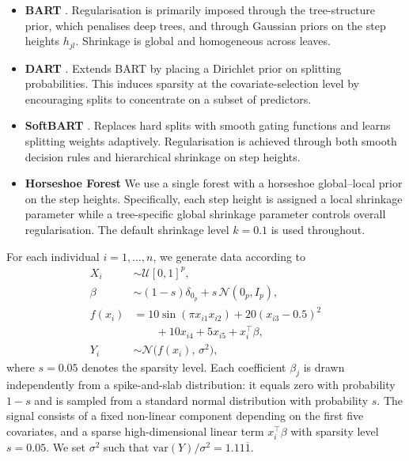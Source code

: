 \begin{itemize}

\item \textbf{BART} \citep{BARToriginal}.  
Regularisation is primarily imposed through the tree-structure prior, which penalises deep trees, and through Gaussian priors on the step heights $h_{jl}$. 
Shrinkage is global and homogeneous across leaves.

\item \textbf{DART} \citep{linero2018dirichlet}.  
Extends BART by placing a Dirichlet prior on splitting probabilities. 
This induces sparsity at the covariate-selection level by encouraging splits to concentrate on a subset of predictors.

\item \textbf{SoftBART} \citep{LineroYang2018}.  
Replaces hard splits with smooth gating functions and learns splitting weights adaptively. 
Regularisation is achieved through both smooth decision rules and hierarchical shrinkage on step heights.

\item \textbf{Horseshoe Forest} \citep{main_article}  
We use a single forest with a horseshoe global--local prior on the step heights.
Specifically, each step height is assigned a local shrinkage parameter while a tree-specific global shrinkage parameter controls overall regularisation. 
The default shrinkage level $k=0.1$ is used throughout. 


\end{itemize}


For each individual $i = 1,\ldots,n$, we generate data according to
\begin{equation}
\begin{split}
    X_i &\sim \mathcal{U}[0,1]^p, \\
    \beta &\sim (1-s)\delta_{0_p} + s\,\mathcal{N}(0_p, I_p), \\
    f(x_i) &= 10 \sin(\pi x_{i1} x_{i2})
             + 20 (x_{i3} - 0.5)^2\\
             &\quad\quad + 10 x_{i4}
             + 5 x_{i5}
             + x_i^\top \beta, \\
    Y_i &\sim \mathcal{N}\big(f(x_i),\, \sigma^2\big),
\end{split}
\end{equation}
where $s = 0.05$ denotes the sparsity level. 
Each coefficient $\beta_j$ is drawn independently from a spike-and-slab distribution: it equals zero with probability $1-s$ and is sampled from a standard normal distribution with probability $s$.
The signal consists of a fixed non-linear component \citep{Friedman} depending on the first five covariates, and a sparse high-dimensional linear term $x_i^\top \beta$ with  sparsity level $s=0.05$. 
We set $\sigma^2$ such that $\mathrm{var}(Y)/\sigma^2 = 1.11\overline{1}$.


